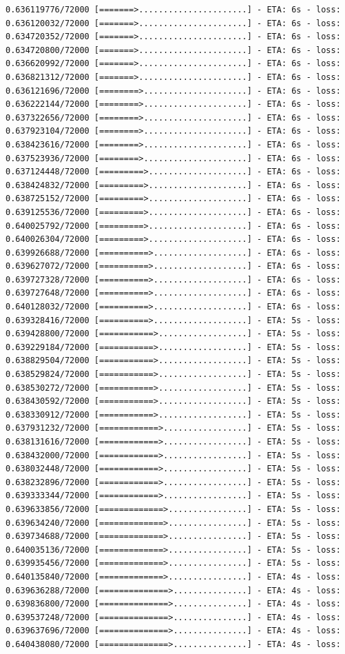 \documentclass[12pt,fleqn]{article}\usepackage{../../common}
\begin{document}
\begin{verbatim}
0.636119776/72000 [=======>......................] - ETA: 6s - loss: 0.636120032/72000 [=======>......................] - ETA: 6s - loss: 0.634720352/72000 [=======>......................] - ETA: 6s - loss: 0.634720800/72000 [=======>......................] - ETA: 6s - loss: 0.636620992/72000 [=======>......................] - ETA: 6s - loss: 0.636821312/72000 [=======>......................] - ETA: 6s - loss: 0.636121696/72000 [========>.....................] - ETA: 6s - loss: 0.636222144/72000 [========>.....................] - ETA: 6s - loss: 0.637322656/72000 [========>.....................] - ETA: 6s - loss: 0.637923104/72000 [========>.....................] - ETA: 6s - loss: 0.638423616/72000 [========>.....................] - ETA: 6s - loss: 0.637523936/72000 [========>.....................] - ETA: 6s - loss: 0.637124448/72000 [=========>....................] - ETA: 6s - loss: 0.638424832/72000 [=========>....................] - ETA: 6s - loss: 0.638725152/72000 [=========>....................] - ETA: 6s - loss: 0.639125536/72000 [=========>....................] - ETA: 6s - loss: 0.640025792/72000 [=========>....................] - ETA: 6s - loss: 0.640026304/72000 [=========>....................] - ETA: 6s - loss: 0.639926688/72000 [==========>...................] - ETA: 6s - loss: 0.639627072/72000 [==========>...................] - ETA: 6s - loss: 0.639727328/72000 [==========>...................] - ETA: 6s - loss: 0.639727648/72000 [==========>...................] - ETA: 6s - loss: 0.640128032/72000 [==========>...................] - ETA: 6s - loss: 0.639328416/72000 [==========>...................] - ETA: 5s - loss: 0.639428800/72000 [===========>..................] - ETA: 5s - loss: 0.639229184/72000 [===========>..................] - ETA: 5s - loss: 0.638829504/72000 [===========>..................] - ETA: 5s - loss: 0.638529824/72000 [===========>..................] - ETA: 5s - loss: 0.638530272/72000 [===========>..................] - ETA: 5s - loss: 0.638430592/72000 [===========>..................] - ETA: 5s - loss: 0.638330912/72000 [===========>..................] - ETA: 5s - loss: 0.637931232/72000 [============>.................] - ETA: 5s - loss: 0.638131616/72000 [============>.................] - ETA: 5s - loss: 0.638432000/72000 [============>.................] - ETA: 5s - loss: 0.638032448/72000 [============>.................] - ETA: 5s - loss: 0.638232896/72000 [============>.................] - ETA: 5s - loss: 0.639333344/72000 [============>.................] - ETA: 5s - loss: 0.639633856/72000 [=============>................] - ETA: 5s - loss: 0.639634240/72000 [=============>................] - ETA: 5s - loss: 0.639734688/72000 [=============>................] - ETA: 5s - loss: 0.640035136/72000 [=============>................] - ETA: 5s - loss: 0.639935456/72000 [=============>................] - ETA: 5s - loss: 0.640135840/72000 [=============>................] - ETA: 4s - loss: 0.639636288/72000 [==============>...............] - ETA: 4s - loss: 0.639836800/72000 [==============>...............] - ETA: 4s - loss: 0.639537248/72000 [==============>...............] - ETA: 4s - loss: 0.639637696/72000 [==============>...............] - ETA: 4s - loss: 0.640438080/72000 [==============>...............] - ETA: 4s - loss: 
\end{verbatim}
\end{document}
